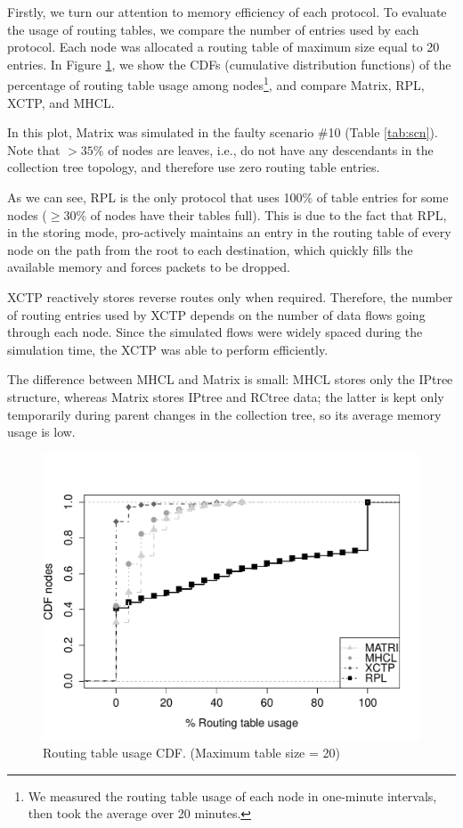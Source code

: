 Firstly, we turn our attention to memory efficiency of each protocol. To evaluate the usage of routing tables, we compare the number of entries used by each protocol. Each node was allocated a routing table of maximum size equal to 20 entries.
In Figure \ref{fig:table-usage}, we show the CDFs (cumulative distribution
functions) of the percentage of routing table usage among nodes\footnote{We
measured the routing table usage of each node in one-minute intervals, then
took the average over 20 minutes.}, and compare Matrix, RPL, XCTP, and MHCL.

In this plot, Matrix was simulated in the faulty scenario \#10 (Table \ref{tab:scn}).
Note that $>35\%$ of nodes are leaves, i.e., do not have any descendants in the collection tree topology, and therefore use zero routing table entries.

As we can see, RPL is the only protocol that uses 100\% of table
entries for some nodes ($\geq30\%$ of nodes have their tables full).
This is due to the fact that RPL, in the storing mode, pro-actively
maintains an entry in the routing table of every node on the path
from the root to each destination, which quickly fills the available
memory and forces packets to be dropped.

XCTP reactively stores reverse routes only when required. Therefore, the number of routing
entries used by XCTP depends on the number of data flows going through each node. Since the simulated flows were widely spaced during the simulation time, the XCTP was able to perform efficiently.

The difference between MHCL and Matrix is small: MHCL
stores only the IPtree structure, whereas Matrix stores IPtree and
RCtree data; the latter is kept only temporarily during parent
changes in the collection tree, so its average memory usage is low.

\begin{figure}[h]
    \centering
    \includegraphics[width=1\linewidth]{Images/tableusagex.pdf}
    \caption{Routing table usage CDF. (Maximum table size = 20)}
    \label{fig:table-usage}
\end{figure}

